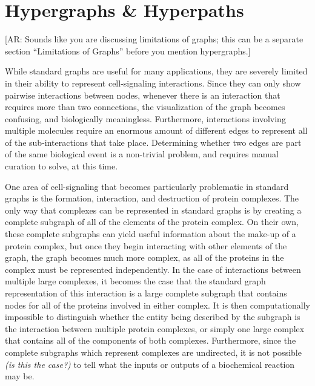 \documentclass[12pt,twoside]{reedthesis}
\newcommand{\anna}[1]{{\color{blue}[AR: #1]}}
\begin{document}
    \chapter{Hypergraphs \& Hyperpaths}
    
    \anna{Sounds like you are discussing limitations of graphs; this can be a separate section ``Limitations of Graphs'' before you mention hypergraphs.}
    
While standard graphs are useful for many applications, they are severely limited in their ability to represent cell-signaling interactions.  Since they can only show pairwise interactions between nodes, whenever there is an interaction that requires more than two connections, the visualization of the graph becomes confusing, and biologically meaningless.  Furthermore, interactions involving multiple molecules require an enormous amount of different edges to represent all of the sub-interactions that take place.  Determining whether two edges are part of the same biological event is a non-trivial problem, and requires manual curation to solve, at this time.

One area of cell-signaling that becomes particularly problematic in standard graphs is the formation, interaction, and destruction of protein complexes.  The only way that complexes can be represented in standard graphs is by creating a complete subgraph of all of the elements of the protein complex.  On their own, these complete subgraphs can yield useful information about the make-up of a protein complex, but once they begin interacting with other elements of the graph, the graph becomes much more complex, as all of the proteins in the complex must be represented independently.  In the case of interactions between multiple large complexes, it becomes the case that the standard graph representation of this interaction is a large complete subgraph that contains nodes for all of the proteins involved in either complex.  It is then computationally impossible to distinguish whether the entity being described by the subgraph is the interaction between multiple protein complexes, or simply one large complex that contains all of the components of both complexes.  Furthermore, since the complete subgraphs which represent complexes are undirected, it is not possible \textit{(is this the case?)} to tell what the inputs or outputs of a biochemical reaction may be. 
\end{document}
